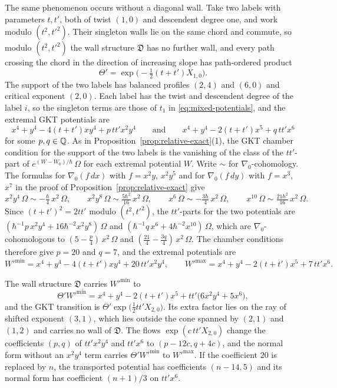 The same phenomenon occurs without a diagonal wall.  Take two labels with
parameters $t,t'$, both of twist $(1,0)$ and descendent degree one, and work
modulo $(t^2,t'^2)$.  Their singleton walls lie on the same chord and
commute, so modulo $(t^2,t'^2)$ the wall structure $\mathfrak D$ has no further
wall, and every path crossing the chord in the direction of increasing slope
has path-ordered product
\[
 \Theta'=\exp\!\bigl(-\tfrac12(t+t')X_{1,0}\bigr).
\]
The support of the two labels has balanced profiles $(2,4)$ and $(6,0)$ and
critical exponent $(2,0)$.  Each label has the twist and descendent degree of
the label $i$, so the singleton terms are those of $t_1$ in
\eqref{eq:mixed-potentials}, and the extremal GKT potentials are
\[
 x^4+y^4-4(t+t')xy^4+p\,tt'x^2y^4
 \qquad\text{and}\qquad
 x^4+y^4-2(t+t')x^5+q\,tt'x^6
\]
for some $p,q\in\mathbb Q$.  As in Proposition~\ref{prop:relative-exact}(1), the
GKT chamber condition for the support of the two labels is the vanishing of
the class of the $tt'$-part of $e^{(W-W_0)/\hbar}\,\Omega$ for each extremal
potential $W$.  Write $\sim$ for
$\nabla_0$-cohomology.  The formulas for $\nabla_0(f\,dx)$ with $f=x^2y$,
$x^2y^5$ and for $\nabla_0(f\,dy)$ with $f=x^3$, $x^7$ in the proof of
Proposition~\ref{prop:relative-exact} give
\[
 x^2y^4\,\Omega\sim-\tfrac{\hbar}4\,x^2\,\Omega,\qquad
 x^2y^8\,\Omega\sim\tfrac{5\hbar^2}{16}\,x^2\,\Omega,\qquad
 x^6\,\Omega\sim-\tfrac{3\hbar}4\,x^2\,\Omega,\qquad
 x^{10}\,\Omega\sim\tfrac{21\hbar^2}{16}\,x^2\,\Omega.
\]
Since $(t+t')^2=2tt'$ modulo $(t^2,t'^2)$, the $tt'$-parts for the two
potentials are $(\hbar^{-1}p\,x^2y^4+16\hbar^{-2}x^2y^8)\,\Omega$ and
$(\hbar^{-1}q\,x^6+4\hbar^{-2}x^{10})\,\Omega$, which are $\nabla_0$-cohomologous
to $(5-\frac p4)\,x^2\,\Omega$ and $(\frac{21}4-\frac{3q}4)\,x^2\,\Omega$.  The
chamber conditions therefore give $p=20$ and $q=7$, and the extremal
potentials are
\[
 W'^{\min}=x^4+y^4-4(t+t')xy^4+20\,tt'x^2y^4,
 \qquad
 W'^{\max}=x^4+y^4-2(t+t')x^5+7\,tt'x^6.
\]

\begin{proposition}
\label{prop:same-twist}
The wall structure $\mathfrak D$ carries $W'^{\min}$ to
\[
 \Theta'W'^{\min}=x^4+y^4-2(t+t')x^5+tt'\bigl(6x^2y^4+5x^6\bigr),
\]
and the GKT transition is
$\Theta'\exp\!\bigl(\tfrac12tt'X_{2,0}\bigr)$.  Its extra factor lies on
the ray of shifted exponent $(3,1)$, which lies outside the cone spanned by
$(2,1)$ and $(1,2)$ and carries no wall of $\mathfrak D$.  The flows
$\exp(c\,tt'X_{2,0})$ change the coefficients $(p,q)$ of $tt'x^2y^4$ and
$tt'x^6$ to $(p-12c,q+4c)$, and the normal form without an $x^2y^4$ term
carries $\Theta'W'^{\min}$ to $W'^{\max}$.  If the coefficient $20$ is
replaced by $n$, the transported potential has coefficients $(n-14,5)$ and
its normal form has coefficient $(n+1)/3$ on $tt'x^6$.
\end{proposition}

